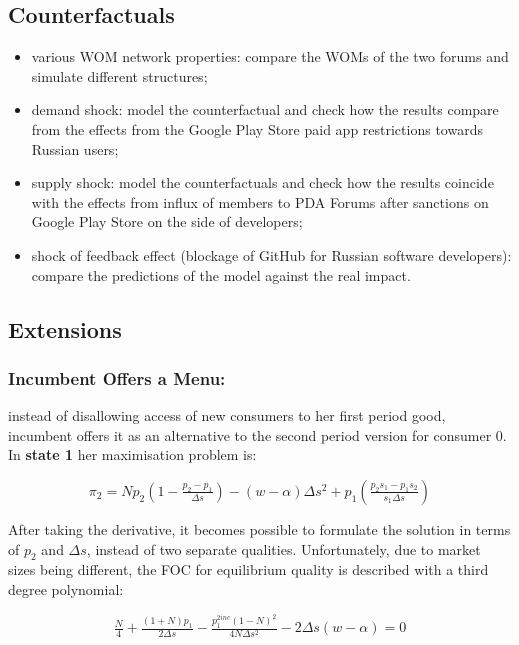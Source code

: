 \documentclass{article}
\numberwithin{figure}{section}
\numberwithin{table}{section}
\theoremstyle{indented}
\numberwithin{equation}{section} %
\begin{document}
\subsection{Counterfactuals}
\begin{itemize}
    \item various WOM network properties:
    compare the WOMs of the two forums and simulate different structures;
    \item demand shock: 
    model the counterfactual and check how the results compare from the effects from the Google Play Store paid app restrictions towards Russian users;
    \item supply shock: 
    model the counterfactuals and check how the results coincide with the effects from influx of members to PDA Forums after sanctions on Google Play Store on the side of developers;
    \item shock of feedback effect (blockage of GitHub for Russian software developers): compare the predictions of the model against the real impact.
\end{itemize}

\subsection{Extensions}

\subsubsection{Incumbent Offers a Menu:}

instead of disallowing access of new consumers to her first period good, incumbent offers it as an alternative to the second period version for consumer 0. In \textbf{state 1} her maximisation problem is:

$$\pi_2 = Np_2(1-\tfrac{p_2-p_1}{\Delta s}) - (w-\alpha)\Delta s^2 + p_1(\tfrac{p_2s_1-p_1s_2}{s_1\Delta s})$$

After taking the derivative, it becomes possible to formulate the solution in terms of $p_2$ and $\Delta s$, instead of two separate qualities. Unfortunately, due to market sizes being different, the FOC for equilibrium quality is described with a third degree polynomial:

$$\tfrac{N}{4} + \tfrac{(1+N)p_1}{2\Delta s} - \tfrac{p_1^{2inc}(1-N)^2}{4N\Delta s^2} - 2 \Delta s (w-\alpha)=0$$
\end{document}
